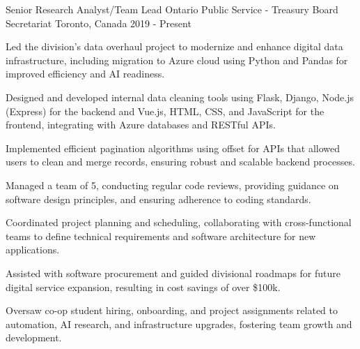 
\begin{cventries}

\cventry
	{Senior Research Analyst/Team Lead}
	{Ontario Public Service - Treasury Board Secretariat}
	{Toronto, Canada}
	{2019 - Present}
	{
		\begin{cvitems}
			\item Led the division's data overhaul project to modernize and enhance digital data infrastructure, including migration to Azure cloud using Python and Pandas for improved efficiency and AI readiness.
			\item Designed and developed internal data cleaning tools using Flask, Django, Node.js (Express) for the backend and Vue.js, HTML, CSS, and JavaScript for the frontend, integrating with Azure databases and RESTful APIs.
			\item Implemented efficient pagination algorithms using offset for APIs that allowed users to clean and merge records, ensuring robust and scalable backend processes.
			\item Managed a team of 5, conducting regular code reviews, providing guidance on software design principles, and ensuring adherence to coding standards.
			\item Coordinated project planning and scheduling, collaborating with cross-functional teams to define technical requirements and software architecture for new applications.
			\item Assisted with software procurement and guided divisional roadmaps for future digital service expansion, resulting in cost savings of over \$100k.
			\item Oversaw co-op student hiring, onboarding, and project assignments related to automation, AI research, and infrastructure upgrades, fostering team growth and development.
		\end{cvitems}
	}


\end{cventries}
